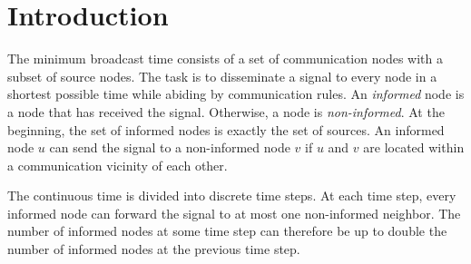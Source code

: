 
\author{First Author         \and
        Second Author %
}



\date{Received: date / Accepted: date}


\maketitle

\begin{abstract}
\keywords{}
\end{abstract}

\section{Introduction}
\label{intro}
The minimum broadcast time consists of a set of communication nodes with a subset of source nodes. 
The task is to disseminate a signal to every node in a shortest possible time while abiding by communication rules.
An \emph{informed} node is a node that has received the signal.
Otherwise, a node is \emph{non-informed}.
At the beginning, the set of informed nodes is exactly the set of sources.
An informed node $u$ can send the signal to a non-informed node $v$ if $u$ and $v$ are located within a communication vicinity of each other.

The continuous time is divided into discrete time steps.
At each time step, every informed node can forward the signal to at most one non-informed neighbor.
The number of informed nodes at some time step can therefore be up to double the number of informed nodes at the previous time step.
%
